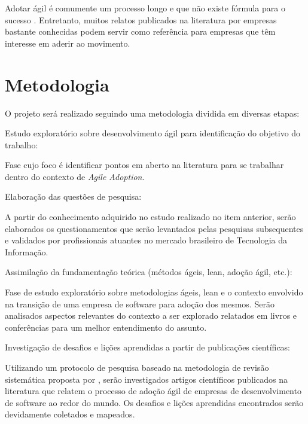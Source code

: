 \documentclass[a4paper,11pt]{article}
\newcounter{contadorDeEtapas}
\begin{document}
Adotar ágil é comumente um processo longo e que não existe fórmula para o sucesso \cite{Block2011}. Entretanto, muitos relatos publicados na literatura por empresas bastante conhecidas \cite{Adobe2012,Microsoft2013,NHN2012} podem servir como referência para empresas que têm interesse em aderir ao movimento.

\section{Metodologia}
O projeto será realizado seguindo uma metodologia dividida em diversas etapas:
\begin{list}{\bfseries{}E -~}{\bfseries}
		\item Estudo exploratório sobre desenvolvimento ágil para identificação do objetivo do trabalho:

			\textnormal{Fase cujo foco é identificar pontos em aberto na literatura para se trabalhar dentro do contexto de \textit{Agile Adoption}.}

		\item Elaboração das questões de pesquisa:

			\textnormal{A partir do conhecimento adquirido no estudo realizado no item anterior, serão elaborados os questionamentos que serão levantados pelas pesquisas subsequentes e validados por profissionais atuantes no mercado brasileiro de Tecnologia da Informação.}

		\item Assimilação da fundamentação teórica (métodos ágeis, lean, adoção ágil, etc.):

			\textnormal{Fase de estudo exploratório sobre metodologias ágeis, lean e o contexto envolvido na transição de uma empresa de software para adoção dos mesmos. Serão analisados aspectos relevantes do contexto a ser explorado relatados em livros e conferências para um melhor entendimento do assunto.}

		\item Investigação de desafios e lições aprendidas  a partir de publicações científicas:

			\textnormal{Utilizando um protocolo de pesquisa baseado na metodologia de revisão sistemática proposta por \cite{Barbara2004}, serão investigados artigos científicos publicados na literatura que relatem o processo de adoção ágil de empresas de desenvolvimento de software ao redor do mundo. Os desafios e lições aprendidas encontrados serão devidamente coletados e mapeados.}


\end{list}
\end{document}
